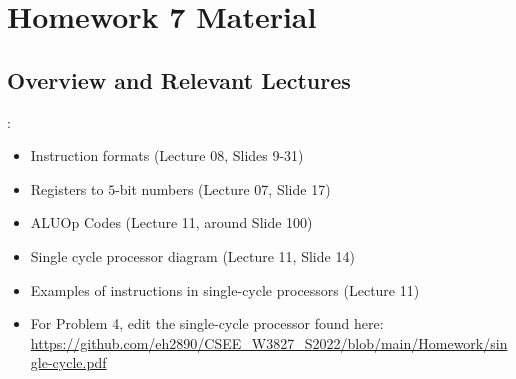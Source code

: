 \documentclass{../slides}
\begin{document}
\section{Homework 7 Material}
\subsection{Overview and Relevant Lectures}
\begin{frame}{\secname: \subsecname}
    \begin{itemize}
        \item Instruction formats (Lecture 08, Slides 9-31)
        \item Registers to $5$-bit numbers (Lecture 07, Slide 17)
        \item ALUOp Codes (Lecture 11, around Slide 100)
        \item Single cycle processor diagram (Lecture 11, Slide 14)
        \item Examples of instructions in single-cycle processors (Lecture 11)
        \item For Problem 4, edit the single-cycle processor found here: \url{https://github.com/eh2890/CSEE_W3827_S2022/blob/main/Homework/single-cycle.pdf}
    \end{itemize}
\end{frame}
\end{document}
